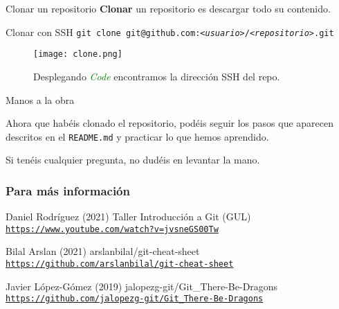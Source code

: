 \documentclass[11pt]{beamer}
\begin{document}
\begin{frame}{Clonar un repositorio}
	\textbf{Clonar} un repositorio es descargar todo su contenido.

    \begin{block}{Clonar con SSH}
        \texttt{git clone git@github.com:\textit{<usuario>}/\textit{<repositorio>}.git}
    \end{block}

    \begin{figure}
        \centering
        \texttt{[image: clone.png]}
        \caption{Desplegando \textcolor{green}{\textit{Code}} encontramos la dirección SSH del repo.}
        \label{fig:enter-label}
    \end{figure}
    
\end{frame}


\begin{frame}{Manos a la obra}
	
    Ahora que habéis clonado el repositorio, podéis seguir los pasos que aparecen descritos en el \texttt{README.md} y practicar lo que hemos aprendido.

    \bigskip

    Si tenéis cualquier pregunta, no dudéis en levantar la mano.
 
\end{frame}


\begin{frame} %
	\frametitle{Para más información}
	
	\begin{thebibliography}{99} %
		\footnotesize %
		
			Daniel Rodríguez (2021)
			\newblock Taller Introducción a Git (GUL)
            		\newblock \href{https://www.youtube.com/watch?v=jvsneGS00Tw&t=791s}{\texttt{https://www.youtube.com/watch?v=jvsneGS00Tw}}
			
			Bilal Arslan (2021)
			\newblock arslanbilal/git-cheat-sheet
			\newblock \href{https://github.com/arslanbilal/git-cheat-sheet}{\texttt{https://github.com/arslanbilal/git-cheat-sheet}}
   
			Javier López-Gómez (2019)
			\newblock jalopezg-git/Git_There-Be-Dragons
			\newblock \href{https://github.com/jalopezg-git/Git_There-Be-Dragons}{\texttt{https://github.com/jalopezg-git/Git_There-Be-Dragons}}
   
	\end{thebibliography}
\end{frame}

\end{document}
